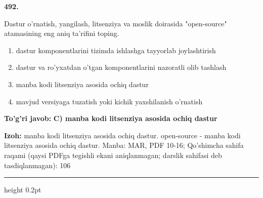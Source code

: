 \documentclass[10pt,a4paper]{article}
\begin{document}
{\bfseries\sffamily\color{ink} 492.}
\par
Dastur o'rnatish, yangilash, litsenziya va moslik doirasida "open-source" atamasining eng aniq ta'rifini toping.
\begin{enumerate}[label=\Alph*),leftmargin=9mm]
\item dastur komponentlarini tizimda ishlashga tayyorlab joylashtirish
\item dastur va ro'yxatdan o'tgan komponentlarini nazoratli olib tashlash
\item manba kodi litsenziya asosida ochiq dastur
\item mavjud versiyaga tuzatish yoki kichik yaxshilanish o'rnatish
\end{enumerate}
\begin{tcolorbox}[enhanced,breakable,colback=teal!4,colframe=teal!60!black,boxrule=0.45pt,arc=1.2mm,left=2.7mm,right=2.7mm,top=1.8mm,bottom=1.8mm,before skip=2mm,after skip=2mm]
{\bfseries\sffamily\color{teal}To'g'ri javob:} \textbf{C) manba kodi litsenziya asosida ochiq dastur}
\par\smallskip
{\bfseries Izoh:} manba kodi litsenziya asosida ochiq dastur. open-source - manba kodi litsenziya asosida ochiq dastur. Manba: MAR, PDF 10-16; Qo'shimcha sahifa raqami (qaysi PDFga tegishli ekani aniqlanmagan; darslik sahifasi deb tasdiqlanmagan): 106
\end{tcolorbox}
\vspace{2mm}\hrule height 0.2pt\vspace{3mm}
\end{document}
